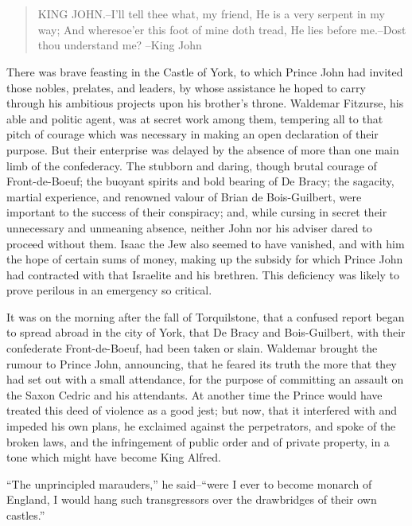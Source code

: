 \chapter{}

\begin{quote}
KING JOHN.--I'll tell thee what, my friend,
He is a very serpent in my way;
And wheresoe'er this foot of mine doth tread,
He lies before me.--Dost thou understand me?
--King John
\end{quote}

There was brave feasting in the Castle of York, to which Prince John had
invited those nobles, prelates, and leaders, by whose assistance he
hoped to carry through his ambitious projects upon his brother's throne.
Waldemar Fitzurse, his able and politic agent, was at secret work among
them, tempering all to that pitch of courage which was necessary in
making an open declaration of their purpose. But their enterprise was
delayed by the absence of more than one main limb of the confederacy.
The stubborn and daring, though brutal courage of Front-de-Boeuf; the
buoyant spirits and bold bearing of De Bracy; the sagacity, martial
experience, and renowned valour of Brian de Bois-Guilbert, were
important to the success of their conspiracy; and, while cursing in
secret their unnecessary and unmeaning absence, neither John nor his
adviser dared to proceed without them. Isaac the Jew also seemed to have
vanished, and with him the hope of certain sums of money, making up the
subsidy for which Prince John had contracted with that Israelite and his
brethren. This deficiency was likely to prove perilous in an emergency
so critical.

It was on the morning after the fall of Torquilstone, that a confused
report began to spread abroad in the city of York, that De Bracy and
Bois-Guilbert, with their confederate Front-de-Boeuf, had been taken or
slain. Waldemar brought the rumour to Prince John, announcing, that he
feared its truth the more that they had set out with a small attendance,
for the purpose of committing an assault on the Saxon Cedric and his
attendants. At another time the Prince would have treated this deed of
violence as a good jest; but now, that it interfered with and impeded
his own plans, he exclaimed against the perpetrators, and spoke of the
broken laws, and the infringement of public order and of private
property, in a tone which might have become King Alfred.

``The unprincipled marauders,'' he said--``were I ever to become monarch
of England, I would hang such transgressors over the drawbridges of
their own castles.''

